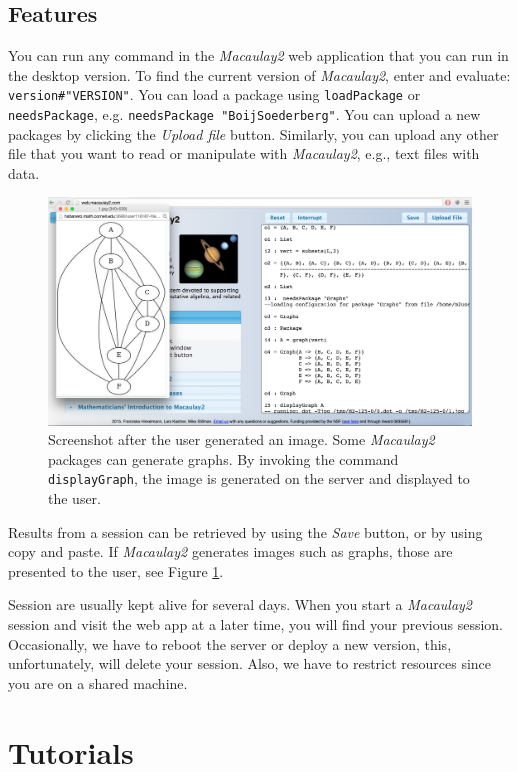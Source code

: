 \documentclass[twocolumn]{article}
\def\M2{{\it Macaulay2}}
\begin{document}
\subsection{Features}
You can run any command in the \M2 web application that you can run in the desktop version.
To find the current version of \M2,
enter and evaluate: {\tt version\#"VERSION"}.  You can load a package
 using {\tt loadPackage} or {\tt needsPackage}, e.g. {\tt needsPackage "BoijSoederberg"}.  
You can upload a new packages by clicking the {\it Upload file}
button. Similarly, you can upload any other file that you want to 
read or manipulate with \M2, e.g., text files with data. 

\begin{figure}[htb]
    \includegraphics[width=.95\textwidth]{withGraph.jpg}
    \caption{Screenshot after the user
      generated an image. Some \M2 packages can generate
      graphs. By invoking the command {\tt displayGraph}, the image is
      generated on the server and displayed to the user.}
    \label{fig:graph}
\end{figure}

Results from a session can be retrieved by using the {\it Save}
button, or by using copy and paste. If \M2 generates
images such as graphs, those are presented to the user, see Figure \ref{fig:graph}.


Session are usually kept alive for several days. When you start a \M2 session and visit the web app at a later time, 
you will find your previous session. Occasionally, 
we have to reboot the server or deploy a new version, this, 
unfortunately, will delete your session. Also, we have to restrict resources since you are on a shared machine.

\section{Tutorials}
\end{document}
